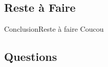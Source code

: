 \subsection{Reste à Faire}

\begin{frame}{Conclusion}{Reste à faire}
	Coucou
\end{frame}

\subsection{Questions}

{
\begin{frame}[plain]
    
\end{frame}
}